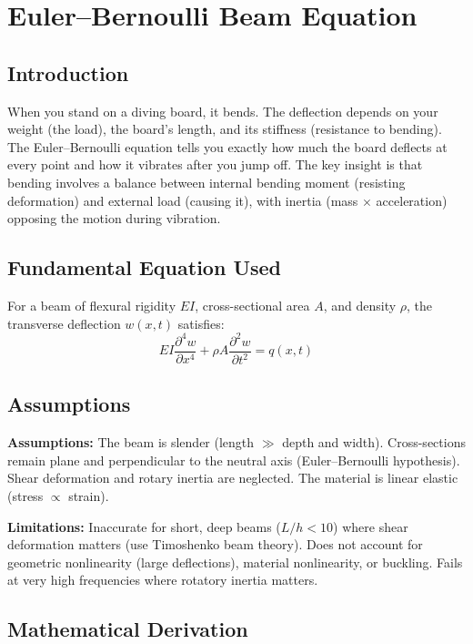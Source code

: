 \documentclass[11pt,openright]{book}
\begin{document}

\chapter{Euler--Bernoulli Beam Equation}

\section*{Introduction}

When you stand on a diving board, it bends. The deflection depends on your weight (the load), the board's length, and its stiffness (resistance to bending). The Euler--Bernoulli equation tells you exactly how much the board deflects at every point and how it vibrates after you jump off. The key insight is that bending involves a balance between internal bending moment (resisting deformation) and external load (causing it), with inertia (mass $\times$ acceleration) opposing the motion during vibration.
\section*{Fundamental Equation Used}

For a beam of flexural rigidity $EI$, cross-sectional area $A$, and density $\rho$, the transverse deflection $w(x,t)$ satisfies:
\[
EI\frac{\partial^4 w}{\partial x^4} + \rho A \frac{\partial^2 w}{\partial t^2} = q(x,t)
\]
\section*{Assumptions}

\textbf{Assumptions:} The beam is slender (length $\gg$ depth and width). Cross-sections remain plane and perpendicular to the neutral axis (Euler--Bernoulli hypothesis). Shear deformation and rotary inertia are neglected. The material is linear elastic (stress $\propto$ strain).


\textbf{Limitations:} Inaccurate for short, deep beams ($L/h < 10$) where shear deformation matters (use Timoshenko beam theory). Does not account for geometric nonlinearity (large deflections), material nonlinearity, or buckling. Fails at very high frequencies where rotatory inertia matters.


\section*{Mathematical Derivation}
\end{document}
